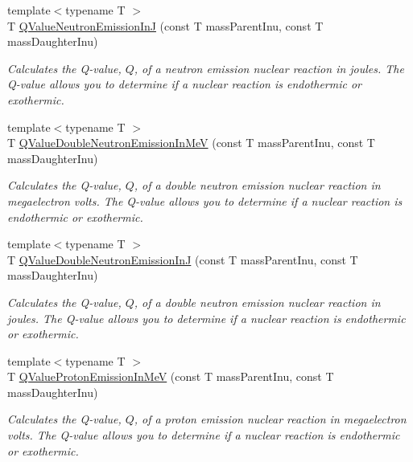 \begin{DoxyCompactItemize}
{\footnotesize template$<$typename T $>$ }\\T \mbox{\hyperlink{group___e_g_x_phys-_q_value-_neutron_emission_gacb17fa06731637937bc65765943d67ca}{Q\+Value\+Neutron\+Emission\+InJ}} (const T mass\+Parent\+Inu, const T mass\+Daughter\+Inu)
\begin{DoxyCompactList}\small\item\em Calculates the Q-\/value, $Q$, of a neutron emission nuclear reaction in joules. The Q-\/value allows you to determine if a nuclear reaction is endothermic or exothermic. \end{DoxyCompactList}\item 
{\footnotesize template$<$typename T $>$ }\\T \mbox{\hyperlink{group___e_g_x_phys-_q_value-_neutron_emission_gaeafae8a98e46b701517c1a2b8bfc241d}{Q\+Value\+Double\+Neutron\+Emission\+In\+MeV}} (const T mass\+Parent\+Inu, const T mass\+Daughter\+Inu)
\begin{DoxyCompactList}\small\item\em Calculates the Q-\/value, $Q$, of a double neutron emission nuclear reaction in megaelectron volts. The Q-\/value allows you to determine if a nuclear reaction is endothermic or exothermic. \end{DoxyCompactList}\item 
{\footnotesize template$<$typename T $>$ }\\T \mbox{\hyperlink{group___e_g_x_phys-_q_value-_neutron_emission_gae8a2c7bd5c4facaea7615eccdfc47be1}{Q\+Value\+Double\+Neutron\+Emission\+InJ}} (const T mass\+Parent\+Inu, const T mass\+Daughter\+Inu)
\begin{DoxyCompactList}\small\item\em Calculates the Q-\/value, $Q$, of a double neutron emission nuclear reaction in joules. The Q-\/value allows you to determine if a nuclear reaction is endothermic or exothermic. \end{DoxyCompactList}\item 
{\footnotesize template$<$typename T $>$ }\\T \mbox{\hyperlink{group___e_g_x_phys-_q_value-_proton_emission_ga5d92756e945e66bd2ed7d55145b95c3b}{Q\+Value\+Proton\+Emission\+In\+MeV}} (const T mass\+Parent\+Inu, const T mass\+Daughter\+Inu)
\begin{DoxyCompactList}\small\item\em Calculates the Q-\/value, $Q$, of a proton emission nuclear reaction in megaelectron volts. The Q-\/value allows you to determine if a nuclear reaction is endothermic or exothermic. \end{DoxyCompactList}\item 

\end{DoxyCompactItemize}
